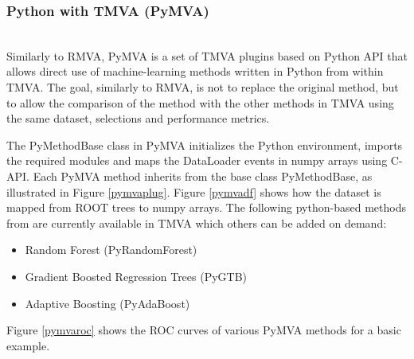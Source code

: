 \documentclass[a4paper]{jpconf}
\begin{document}
\subsubsection{Python with TMVA (PyMVA)} \label{PYMVA}\hspace*{\fill} \\
Similarly to RMVA, PyMVA is a set of TMVA plugins based on Python API that allows direct use of machine-learning methods written in Python from within TMVA. The goal, similarly to RMVA, is not to replace the original method, but to allow the comparison of the method with the other methods in TMVA using the same dataset, selections and performance metrics. 

The PyMethodBase class in PyMVA initializes the Python environment, imports the required modules and maps the DataLoader events in numpy arrays using C-API. Each PyMVA method inherits from the base class PyMethodBase, as illustrated in Figure \ref{pymvaplug}. Figure \ref{pymvadf} shows how the dataset is mapped from ROOT trees to numpy arrays. The following python-based methods from \cite{pedregosa2011scikit} are currently available in TMVA which others can be added on demand:



\begin{itemize}
\item Random Forest (PyRandomForest)
\item Gradient Boosted Regression Trees (PyGTB) 
\item Adaptive Boosting (PyAdaBoost) 
\end{itemize}

Figure \ref{pymvaroc} shows the ROC curves of various PyMVA methods for a basic example.
\end{document}
